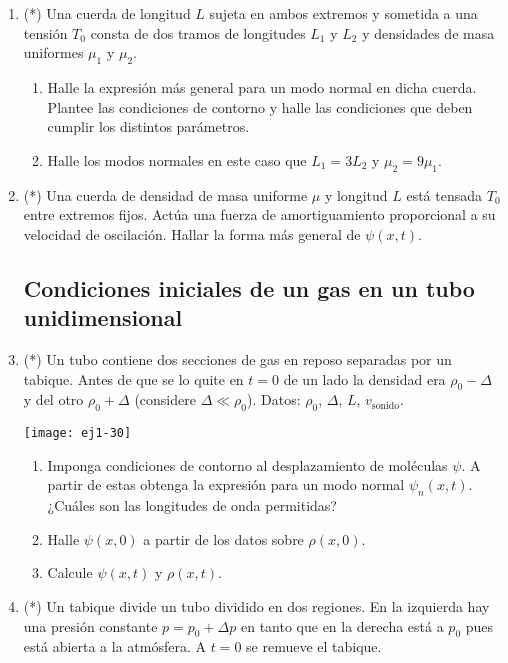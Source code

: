 \documentclass[11pt,spanish,a4paper]{article}
\begin{document}
\begin{enumerate}
\item (*) Una cuerda de longitud $L$ sujeta en ambos extremos y sometida a una tensión $T_{0}$ consta de dos tramos de longitudes $L_1$ y $L_2$ y densidades de masa uniformes $\mu_1$ y $\mu_2$.
\begin{enumerate}
	\item Halle la expresión más general para un modo normal en dicha cuerda.
	Plantee las condiciones de contorno y halle las condiciones que deben cumplir los distintos parámetros.
	\item Halle los modos normales en este caso que $L_{1}=3L_{2}$ y $\mu_{2}=9\mu_{1}$. 
\end{enumerate}


\item (*) Una cuerda de densidad de masa uniforme $\mu$ y longitud $L$ está tensada $T_0$ entre extremos fijos.
Actúa una fuerza de amortiguamiento proporcional a su velocidad de oscilación.
Hallar la forma más general de $\psi(x,t)$.



\subsection*{Condiciones iniciales de un gas en un tubo unidimensional}

\item
\begin{minipage}[t][1.6cm]{0.65\textwidth}
(*) Un tubo contiene dos secciones de gas en reposo separadas por un tabique.
Antes de que se lo quite en $t=0$ de un lado la densidad era $\rho_{0}-\Delta$ y del otro $\rho_{0}+\Delta$ (considere $\Delta\ll\rho_{0}$).
Datos: $\rho_{0}$, $\Delta$, $L$, $v_\text{sonido}$.
\end{minipage}
\begin{minipage}[c][2cm][t]{0.3\textwidth}
	\texttt{[image: ej1-30]}
\end{minipage}
\begin{enumerate}
	\item Imponga condiciones de contorno al desplazamiento de moléculas $\psi$.
	A partir de estas obtenga la expresión para un modo normal $\psi_{n}(x,t)$.
	¿Cuáles son las longitudes de onda permitidas?
	\item Halle $\psi(x,0)$ a partir de los datos sobre $\rho(x,0)$.
	\item Calcule $\psi(x,t)$ y $\rho(x,t)$.
\end{enumerate}


\item
\begin{minipage}[t][2cm]{0.65\textwidth}
(*) Un tabique divide un tubo dividido en dos regiones.
En la izquierda hay una presión constante $p = p_0 + \Delta p$ en tanto que en la derecha está a $p_0$ pues está abierta a la atmósfera.
A $t = 0$ se remueve el tabique.


\end{minipage}
\end{enumerate}
\end{document}
